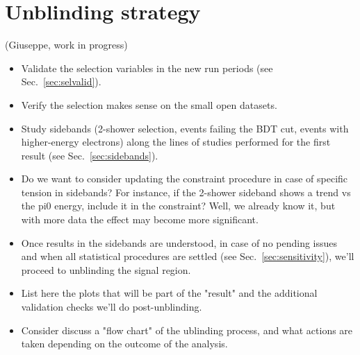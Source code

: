 \newpage
\section{Unblinding strategy}
(Giuseppe, work in progress)

\begin{itemize}
    \item Validate the selection variables in the new run periods (see Sec.~\ref{sec:selvalid}).
    \item Verify the selection makes sense on the small open datasets.
    \item Study sidebands (2-shower selection, events failing the BDT cut, events with higher-energy electrons) along the lines of studies performed for the first result (see Sec.~\ref{sec:sidebands}).
    \item Do we want to consider updating the constraint procedure in case of specific tension in sidebands? For instance, if the 2-shower sideband shows a trend vs the pi0 energy, include it in the constraint? Well, we already know it, but with more data the effect may become more significant.
    \item Once results in the sidebands are understood, in case of no pending issues and when all statistical procedures are settled (see Sec.~\ref{sec:sensitivity}), we'll proceed to unblinding the signal region. 
    \item List here the plots that will be part of the "result" and the additional validation checks we'll do post-unblinding.
    \item Consider discuss a "flow chart" of the ublinding process, and what actions are taken depending on the outcome of the analysis.
\end{itemize}